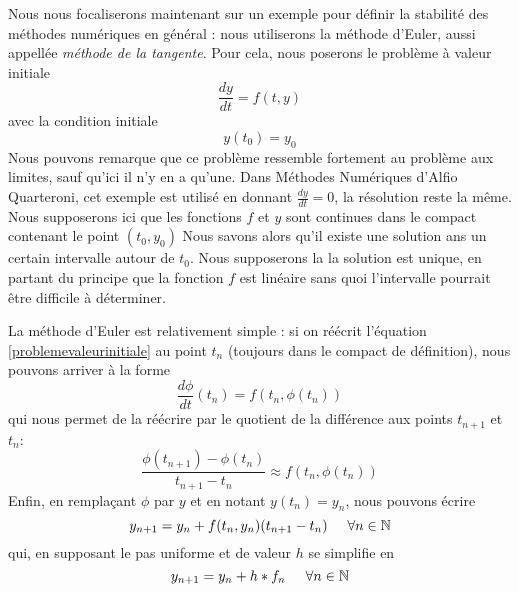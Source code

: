 \documentclass[12pt]{article}
\newcommand{\N}{\mathbb N}
\newcommand{\espace}{\hspace{5mm}}
\begin{document}
\quad Nous nous focaliserons maintenant sur un exemple pour définir la stabilité des méthodes numériques en général : nous utiliserons la méthode d'Euler, aussi appellée \emph{méthode de la tangente}.  Pour cela, nous poserons le problème à valeur initiale
\begin{equation} \label{problemevaleurinitiale}
\frac{dy}{dt} = f(t,y)
\end{equation}
avec la condition initiale
\begin{equation} \label{condInitPVI}
y(t_0) = y_0
\end{equation}
Nous pouvons remarque que ce problème ressemble fortement au problème aux limites, sauf qu'ici il n'y en a qu'une. Dans Méthodes Numériques d'Alfio Quarteroni, cet exemple est utilisé en donnant $\frac{dy}{dt} = 0$, la résolution reste la même. \\
\quad Nous supposerons ici que les fonctions $f$ et $y$ sont continues dans le compact contenant le point $(t_0, y_0)$ Nous savons alors qu'il existe une solution ans un certain intervalle autour de $t_0$.  Nous supposerons la la solution est unique, en partant du principe que la fonction $f$ est linéaire sans quoi l'intervalle pourrait être difficile à déterminer. 

\quad La méthode d'Euler est relativement simple : si on réécrit l'équation \eqref{problemevaleurinitiale} au point $t_n$ (toujours dans le compact de définition), nous pouvons arriver à la forme
\begin{equation}
\frac{d\phi}{dt}(t_n) = f(t_n, \phi(t_n))
\end{equation}
qui nous permet de la réécrire par le quotient de la différence aux points $t_{n+1}$ et $t_n$:
\begin{equation}
\frac{\phi (t_{n+1}) - \phi(t_n)}{t_{n+1} - t_n} \approx f(t_n, \phi (t_n))
\end{equation}
Enfin, en remplaçant $\phi$ par $y$ et en notant $y(t_n) = y_n$, nous pouvons écrire
\begin{equation}
y_{n+1} = y_n + f(t_n, y_n)(t_{n+1} - t_n) \espace \forall n \in \N
\end{equation}
qui, en supposant le pas uniforme et de valeur $h$ se simplifie en
\begin{equation} \label{eulerSimple}
y_{n+1} = y_n + h*f_n \espace \forall n \in \N
\end{equation}
\end{document}
